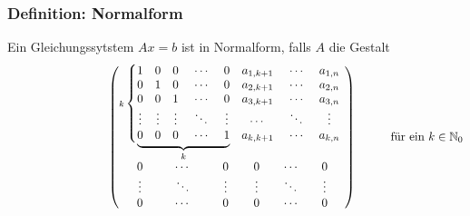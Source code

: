 \documentclass{article}
\newcommand{\N}{\mathbb{N}}
\begin{document}
\subsubsection{Definition: Normalform}
Ein Gleichungssytstem $Ax=b$ ist in Normalform, falls $A$ die Gestalt \\
$$\hspace{3cm}
\left(
\begin{matrix}
	\text{\scriptsize $k$}\left\{\vphantom{
		\begin{matrix}
		1 & 0 & 0 & \ \cdots \ & 0\\
		0 & 1 & 0 & \ \cdots \ & 0\\
		0 & 0 & 1 & \ \cdots \ & 0 \\
		\vdots & \vdots & \vdots&\ddots & \vdots\\
		0 & 0 & 0 & \ \cdots \ & 1\\
		\end{matrix}}\right.\kern-2\nulldelimiterspace
	\underbrace{
	\begin{matrix}
		1 & 0 & 0 & \ \cdots \ & 0\\
		0 & 1 & 0 & \ \cdots \ & 0\\
		0 & 0 & 1 & \ \cdots \ & 0 \\
		\vdots & \vdots & \vdots&\ddots & \vdots\\
		0 & 0 & 0 & \ \cdots \ & 1\\
	\end{matrix}}_{k}
	&
	\begin{matrix}
		a_{1, k+1} & \ \cdots \ & a_{1, n}\\
		a_{2, k+1} & \ \cdots \ & a_{2, n}\\
		a_{3, k+1} & \ \cdots \ & a_{3, n}\\
		\cdots & \ \ddots \ & \vdots\\
		a_{k, k+1} & \ \cdots \ & a_{k, n}\\
	\end{matrix} \\
	\hspace{.5cm}
	\begin{matrix}
		0 &\hspace{.25cm}  & \cdots & \hspace{.25cm}& 0\\
		\vdots &  & \ddots & &\vdots\\
		0 &  & \cdots & & 0\\
	\end{matrix}
	&
	\begin{matrix}
		0 &\hspace{.25cm}\ \cdots\ \hspace{.25cm}& 0\\
		\vdots &\ \ddots\ & \vdots\\
		0 &\ \cdots\ & 0\\
	\end{matrix}
\end{matrix}
\hspace{.15cm}
\right)\text{\hspace{1cm}für ein $k \in \N_0$}$$
\end{document}
